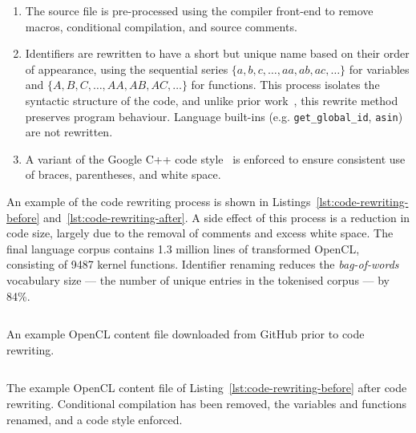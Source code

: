\begin{enumerate}
  \item The source file is pre-processed using the compiler front-end to remove macros, conditional compilation, and source comments.
  \item Identifiers are rewritten to have a short but unique name based on their order of appearance, using the sequential series $\{a,\allowbreak b,\allowbreak c,\allowbreak \ldots,\allowbreak aa,\allowbreak ab,\allowbreak ac,\allowbreak \ldots\}$ for variables and $\{A,\allowbreak B,\allowbreak C,\allowbreak \ldots,\allowbreak AA,\allowbreak AB,\allowbreak AC,\allowbreak \ldots\}$ for functions. This process isolates the syntactic structure of the code, and unlike prior work~\cite{Allamanis2013a}, this rewrite method preserves program behaviour. Language built-ins (e.g. \texttt{get\_global\_id}, \texttt{asin}) are not rewritten.
  \item A variant of the Google C++ code style~\cite{Weinberger2011} is enforced to ensure consistent use of braces, parentheses, and white space.
\end{enumerate}

An example of the code rewriting process is shown in Listings~\ref{lst:code-rewriting-before} and~\ref{lst:code-rewriting-after}. A side effect of this process is a reduction in code size, largely due to the removal of comments and excess white space. The final language corpus contains 1.3 million lines of transformed OpenCL, consisting of 9487 kernel functions. Identifier renaming reduces the \emph{bag-of-words} vocabulary size --- the number of unique entries in the tokenised corpus --- by 84\%.

\begin{listing}
  \inputminted{opencl_lexer.py:OpenCLLexer -x}{lst/clgen-rewrite-before.cl}
  \caption[Example OpenCL content file from GitHub]{An example OpenCL content file downloaded from GitHub prior to code rewriting.}
  \label{lst:code-rewriting-before}
\end{listing}

\begin{listing}
  \inputminted{opencl_lexer.py:OpenCLLexer -x}{lst/clgen-rewrite-after.cl}
  \caption[OpenCL content file after rewriting]{The example OpenCL content file of Listing~\ref{lst:code-rewriting-before} after code rewriting. Conditional compilation has been removed, the variables and functions renamed, and a code style enforced.}
  \label{lst:code-rewriting-after}
\end{listing}


